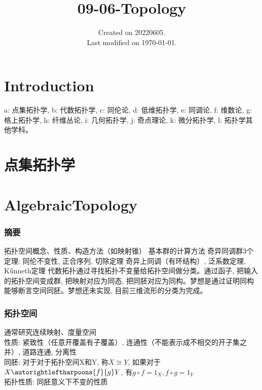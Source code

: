 \documentclass[UTF8]{../09-Mathematics}
\begin{document}
\title{09-06-Topology}
\date{Created on 20220605.\\   Last modified on \today.}
\maketitle
\tableofcontents


\chapter{Introduction}

a: 点集拓扑学, 
b: 代数拓扑学, 
c: 同伦论, 
d: 低维拓扑学,
e: 同调论, 
f: 维数论, 
g: 格上拓扑学, 
h: 纤维丛论, 
i: 几何拓扑学, 
j: 奇点理论, 
k: 微分拓扑学, 
l: 拓扑学其他学科。


\chapter{点集拓扑学}







\chapter{AlgebraicTopology}
\subsection{摘要}
拓扑空间概念、性质、构造方法（如映射锥）
基本群的计算方法
奇异同调群3个定理: 同伦不变性, 正合序列, 切除定理
奇异上同调（有环结构）, 泛系数定理, K\H unneth定理
代数拓扑通过寻找拓扑不变量给拓扑空间做分类。通过函子, 把输入的拓扑空间变成群, 把映射对应为同态, 把同胚对应为同构。梦想是通过证明同构能够断言空间同胚。梦想还未实现, 目前三维流形的分类为完成。
\subsection{拓扑空间}
通常研究连续映射、度量空间\\
性质: 紧致性（任意开覆盖有子覆盖）, 连通性（不能表示成不相交的开子集之并）, 道路连通, 分离性\\
同胚: 对于对于拓扑空间X和Y, 称$X\cong Y$, 如果对于$ X \autorightleftharpoons{f}{g}Y $, 有$ g\circ f =1_X,f\circ g=1_Y $\\
拓扑性质: 同胚意义下不变的性质
\end{document}

